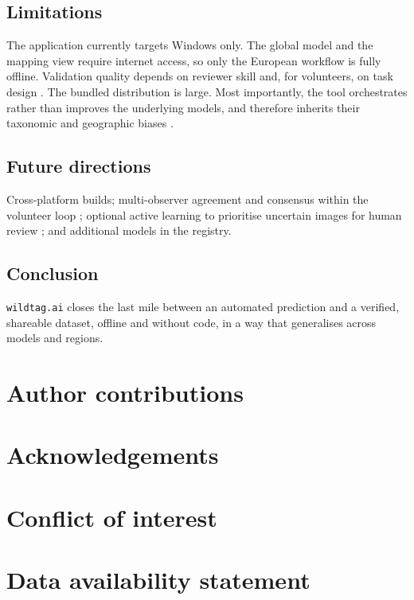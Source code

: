 \documentclass[11pt]{article}
\begin{document}
\subsection*{Limitations}
The application currently targets Windows only. The global model and the mapping
view require internet access, so only the European workflow is fully offline.
Validation quality depends on reviewer skill and, for volunteers, on task design
\cw. The bundled distribution is large. Most importantly, the tool orchestrates
rather than improves the underlying models, and therefore inherits their
taxonomic and geographic biases \cw.

\subsection*{Future directions}
Cross-platform builds; multi-observer agreement and consensus within the
volunteer loop \cw; optional active learning to prioritise uncertain images for
human review \cw; and additional models in the registry.

\subsection*{Conclusion}
\texttt{wildtag.ai} closes the last mile between an automated prediction and a
verified, shareable dataset, offline and without code, in a way that generalises
across models and regions.

\section*{Author contributions}

\section*{Acknowledgements}

\section*{Conflict of interest}

\section*{Data availability statement}
\end{document}
